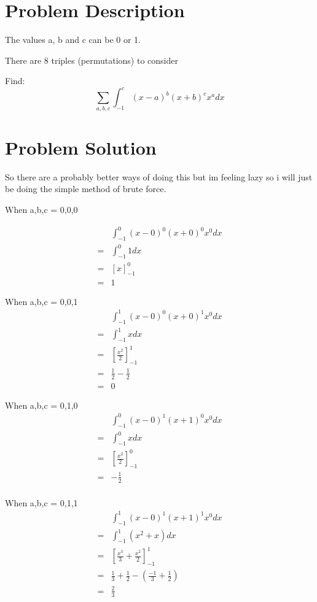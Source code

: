 \documentclass{article}
\begin{document}
\section{Problem Description}
\huge
The values a, b and c can be 0 or 1.

There are 8 triples (permutations) to consider

Find:
\[\sum_{a,b,c}\int^c_{-1}(x-a)^b(x+b)^cx^adx\]

\section{Problem Solution}
So there are a probably better ways of doing this 
but im feeling lazy so i will just be doing the simple 
method of brute force.

When a,b,c = 0,0,0

\begin{align*}
    &\int^0_{-1}(x-0)^0(x+0)^0x^0dx\\
    =&\int^0_{-1}1dx\\
    =&\left[x\right]^0_{-1}\\
    =& 1
\end{align*}

When a,b,c = 0,0,1
\begin{align*}
    &\int^1_{-1}(x-0)^0(x+0)^1x^0dx\\
    =&\int^1_{-1}xdx\\
    =&\left[\frac{x^2}{2}\right]^1_{-1}\\
    =& \frac{1}{2} - \frac{1}{2}\\
    =& 0
\end{align*}

When a,b,c = 0,1,0
\begin{align*}
    &\int^0_{-1}(x-0)^1(x+1)^0x^0dx\\
    =&\int^0_{-1}xdx\\
    =&\left[\frac{x^2}{2}\right]^0_{-1}\\
    =& - \frac{1}{2}\\
\end{align*}

When a,b,c = 0,1,1
\begin{align*}
    &\int^1_{-1}(x-0)^1(x+1)^1x^0dx\\
    =&\int^1_{-1}(x^2 + x)dx\\
    =&\left[\frac{x^3}{3} + \frac{x^2}{2}\right]^1_{-1}\\
    =& \frac{1}{3} + \frac{1}{2} 
     - \left(\frac{-1}{3} + \frac{1}{2}\right)\\
    =& \frac{2}{3}
\end{align*}
\end{document}
